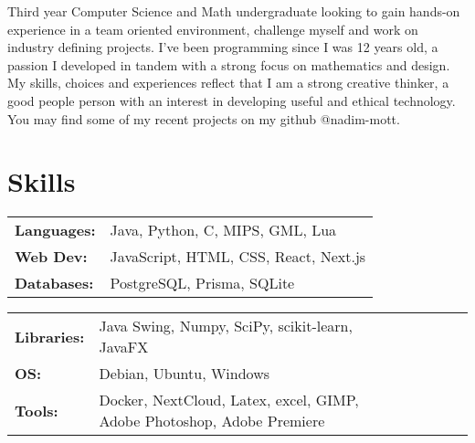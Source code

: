 \documentclass[letterpaper,10pt]{article}
\begin{document}



    Third year Computer Science and Math undergraduate looking to gain hands-on experience
    in a team oriented environment, challenge myself and work on industry
    defining projects. I've been programming since I was 12 years old, a passion
    I developed in tandem with a strong focus on mathematics and design.
    My skills, choices and experiences reflect that I am a strong creative
    thinker, a good people person with an interest in developing useful and
    ethical technology. You may find some of my recent projects on my
    github @nadim-mott.


    \section{Skills}
    \begin{multicols}{2}
            \begin{tabular}{l l}
                \textbf{Languages: } & Java, Python, C, MIPS, GML, Lua \\
                \textbf{Web Dev: } & JavaScript, HTML, CSS, React, Next.js \\
                \textbf{Databases: } & PostgreSQL, Prisma, SQLite \\
            \end{tabular}
            \begin{tabular}{lp{0.8\linewidth} lp{0.8\linewidth}}
                \textbf{Libraries: } & Java Swing, Numpy, SciPy, scikit-learn, JavaFX\\
                \textbf{OS: } & Debian, Ubuntu, Windows\\
                \textbf{Tools: } & Docker, NextCloud, Latex, excel, GIMP, Adobe Photoshop, Adobe Premiere
            \end{tabular}
    \end{multicols}
\end{document}
